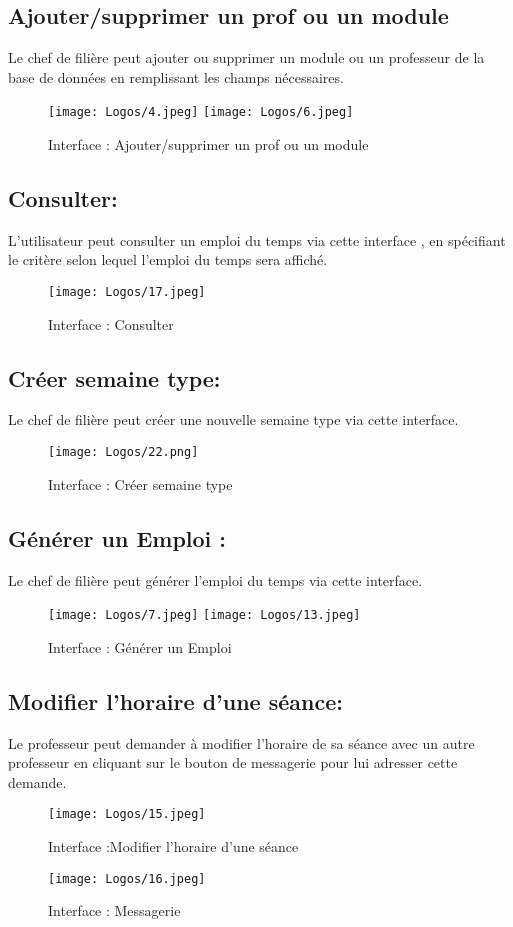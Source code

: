 \subsection*{Ajouter/supprimer un prof ou un module}
Le chef de filière peut ajouter ou supprimer un module ou un professeur de la base de données en remplissant les champs nécessaires.
\begin{figure}[H]
      \centering
        \texttt{[image: Logos/4.jpeg]}
        \texttt{[image: Logos/6.jpeg]}
        \caption{Interface : Ajouter/supprimer un prof ou un module}
\end{figure}
\newpage
\subsection*{Consulter:}
L'utilisateur peut consulter un emploi du temps via cette interface , en spécifiant le critère selon lequel l'emploi du temps sera affiché.\\
\begin{figure}[H]
      \centering
        \texttt{[image: Logos/17.jpeg]}
        \caption{Interface : Consulter}
\end{figure}
\newpage
\subsection*{Créer semaine type:}
Le chef de filière peut créer une nouvelle semaine type via cette interface.\\
\begin{figure}[H]
      \centering
        \texttt{[image: Logos/22.png]}
        \caption{Interface : Créer semaine type}
\end{figure}
\newpage
\subsection*{Générer un Emploi :}
Le chef de filière peut générer l’emploi du temps via cette interface.
\begin{figure}[H]
      \centering
        \texttt{[image: Logos/7.jpeg]}
        \texttt{[image: Logos/13.jpeg]}
        \caption{Interface : Générer un Emploi}
\end{figure}

\newpage
\subsection*{Modifier l’horaire d’une séance:}
Le professeur peut demander à modifier l'horaire de sa séance avec un autre professeur en cliquant sur le bouton de messagerie pour lui adresser cette demande.
\begin{figure}[H]
      \centering
        \texttt{[image: Logos/15.jpeg]}
        \caption{Interface :Modifier l’horaire d’une séance}
        \vspace{0.4cm}
        \texttt{[image: Logos/16.jpeg]}

        \caption{Interface : Messagerie}
\end{figure}
\newpage

